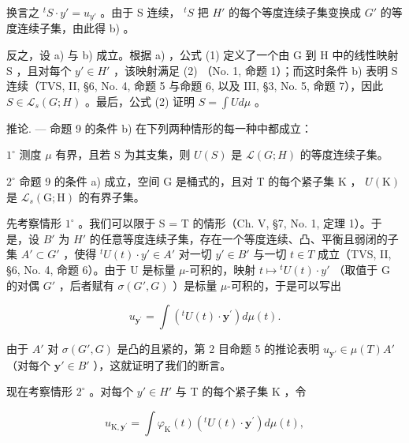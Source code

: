 换言之 \(^{t}S \cdot y' = u_{y'}\) 。由于 S 连续， \(^{t}S\) 把 \(H'\) 的每个等度连续子集变换成 \(G'\) 的等度连续子集，由此得 b) 。

反之，设 a) 与 b) 成立。根据 a) ，公式 (1) 定义了一个由 G 到 H 中的线性映射 S ，且对每个 \(y' \in H'\) ，该映射满足 (2) （No. 1, 命题 1）；而这时条件 b) 表明 S 连续（TVS, II, §6, No. 4, 命题 5 与命题 6, 以及 III, §3, No. 5, 命题 7），因此 \(S \in \mathcal{L}_{s}(G;H)\) 。最后，公式 (2) 证明 \(S = \int U d\mu\) 。

推论. --- 命题 9 的条件 b) 在下列两种情形的每一种中都成立：

\(1^{\circ}\) 测度 \(\mu\) 有界，且若 S 为其支集，则 \(U(S)\) 是 \(\mathcal{L}(G;H)\) 的等度连续子集。

\(2^{\circ}\) 命题 9 的条件 a) 成立，空间 G 是桶式的，且对 T 的每个紧子集 K ， \(U(\mathrm{K})\) 是 \(\mathcal{L}_s(\mathrm{G};\mathrm{H})\) 的有界子集。

先考察情形 \(1^{\circ}\) 。我们可以限于 S = T 的情形（Ch. V, §7, No. 1, 定理 1）。于是，设 \(B'\) 为 \(H'\) 的任意等度连续子集，存在一个等度连续、凸、平衡且弱闭的子集 \(A' \subset G'\) ，使得 \({}^{t}U(t) \cdot y' \in A'\) 对一切 \(y' \in B'\) 与一切 \(t \in T\) 成立（TVS, II, §6, No. 4, 命题 6）。由于 U 是标量 \(\mu\)-可积的，映射 \(t \mapsto {}^{t}U(t) \cdot y'\) （取值于 G 的对偶 \(G'\) ，后者赋有 \(\sigma(G', G)\) ）是标量 \(\mu\)-可积的，于是可以写出

\[
u _ {\mathbf {y} ^ {\prime}} = \int \left(^ {t} U (t) \cdot \mathbf {y} ^ {\prime}\right) d \mu (t).
\]

由于 \(A'\) 对 \(\sigma(G', G)\) 是凸的且紧的，第 2 目命题 5 的推论表明 \(u_{\mathbf{y}'} \in \mu(T)A'\) （对每个 \(\mathbf{y}' \in B'\) ），这就证明了我们的断言。

现在考察情形 \(2^{\circ}\) 。对每个 \(y' \in H'\) 与 T 的每个紧子集 K ，令

\[
u _ {\mathrm{K}, \mathbf {y} ^ {\prime}} = \int \varphi_ {\mathrm{K}} (t) \left(^ {t} U (t) \cdot \mathbf {y} ^ {\prime}\right) d \mu (t),
\]

